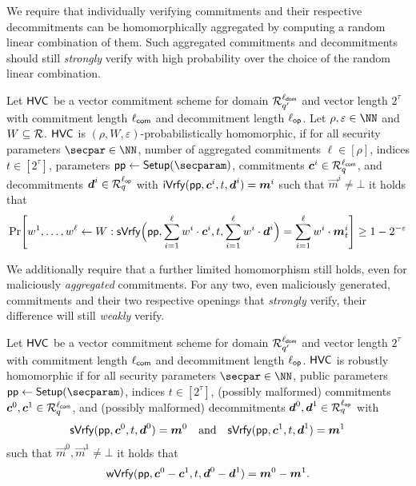 We require that individually verifying commitments and their respective decommitments can be homomorphically aggregated by computing a random linear combination of them.
Such aggregated commitments and decommitments should still \emph{strongly} verify with high probability over the choice of the random linear combination.

\begin{definition}
Let $\mathsf{HVC}$ be a vector commitment scheme for domain $\mathcal{R}^{\ell_{\mathsf{dom}}}_{q'}$ and vector length $2^\tau$ with commitment length ${\ell_{\mathsf{com}}}$ and decommitment length ${\ell_{\mathsf{op}}}$.
Let $\rho,\varepsilon\in\NN$ and $W\subseteq\mathcal{R}$.
$\mathsf{HVC}$ is $(\rho,W,\varepsilon)$-probabilistically homomorphic, if for all security parameters $\secpar\in\NN$, number of aggregated commitments $\ell\in[\rho]$, indices $t\in[2^\tau]$, parameters $\params \gets \setup(\secparam)$, commitments $\boldsymbol{c}^i\in\mathcal{R}_q^{{\ell_{\mathsf{com}}}}$, and decommitments $\boldsymbol{d}^i\in\mathcal{R}_q^{{\ell_{\mathsf{op}}}}$ with $\mathsf{iVrfy}(\mathsf{pp},\boldsymbol{c}^i,t,\boldsymbol{d}^i) = \boldsymbol{m}^i$ such that $\vec{m}^i \neq \bot$ it holds that
  \[
    \Pr\mleft[
      w^1,\dots,w^{\ell} \gets W :
      \sverify\Bigl(\params,\sum_{i=1}^{\ell}w^i\cdot \vec{c}^i,t,\sum_{i=1}^{\ell}w^i\cdot \vec{d}^i\Bigr) = \sum_{i=1}^{\ell}w^i\cdot\vec{m}^i_{t}
    \mright] \geq 1-2^{-\varepsilon}
  \]
\end{definition}

We additionally require that a further limited homomorphism still holds, even for maliciously \emph{aggregated} commitments.
For any two, even maliciously generated, commitments and their two respective openings that \emph{strongly} verify, their difference will still \emph{weakly} verify.

\begin{definition}
  \label{def:malhomhvc}
  Let $\mathsf{HVC}$ be a vector commitment scheme for domain $\mathcal{R}^{\ell_{\mathsf{dom}}}_{q'}$ and vector length $2^\tau$ with commitment length ${\ell_{\mathsf{com}}}$ and decommitment length ${\ell_{\mathsf{op}}}$.
  $\mathsf{HVC}$ is robustly homomorphic if for all security parameters $\secpar\in\NN$, public parameters $\params\gets\setup(\secparam)$, indices $t\in[2^\tau]$, (possibly malformed) commitments $\boldsymbol{c}^0,\boldsymbol{c}^1 \in \mathcal{R}_q^{\ell_{\mathsf{com}}}$, and (possibly malformed) decommitments $\boldsymbol{d}^0,\boldsymbol{d}^1\in\mathcal{R}_q^{\ell_{\mathsf{op}}}$ with
  \[
    \mathsf{sVrfy}(\mathsf{pp},\boldsymbol{c}^0, t,\boldsymbol{d}^0)=\boldsymbol{m}^0 \quad \text{and} \quad \mathsf{sVrfy}(\mathsf{pp},\boldsymbol{c}^1, t,\boldsymbol{d}^1)=\boldsymbol{m}^1
  \]
  such that $\vec{m}^0,\vec{m}^1\neq \bot$ it holds that
  \[
    \mathsf{wVrfy}(\mathsf{pp},\boldsymbol{c}^0 - \boldsymbol{c}^1, t,\boldsymbol{d}^0 - \boldsymbol{d}^1)=\boldsymbol{m}^0 - \boldsymbol{m}^1.
  \]
\end{definition}

